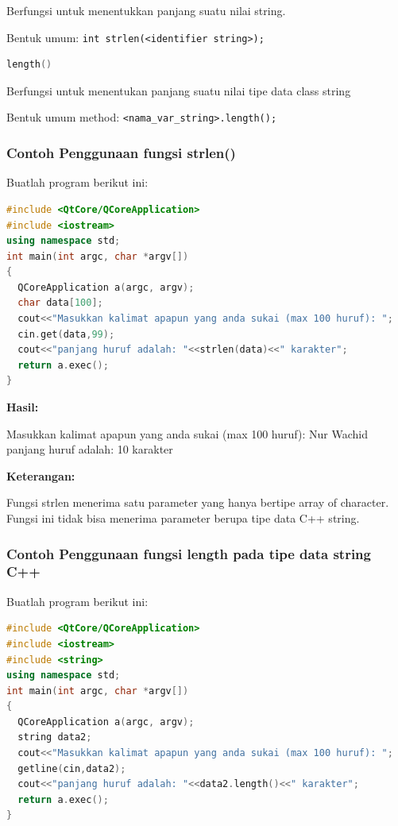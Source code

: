 Berfungsi untuk menentukkan panjang suatu nilai string.

Bentuk umum:
\texttt{int\ strlen(\textless{}identifier\ string\textgreater{});}

\begin{lstlisting}[language=c++, numbers=none]
length()
\end{lstlisting}

Berfungsi untuk menentukan panjang suatu nilai tipe data class string

Bentuk umum method:
\texttt{\textless{}nama\_var\_string\textgreater{}.length();}

\subsubsection*{Contoh  Penggunaan fungsi strlen()}

Buatlah program berikut ini:

\begin{lstlisting}[language=c++, caption=Penggunaan fungsi strlen(), label=contoh3-19]
#include <QtCore/QCoreApplication>
#include <iostream>
using namespace std;
int main(int argc, char *argv[])
{
  QCoreApplication a(argc, argv);
  char data[100];
  cout<<"Masukkan kalimat apapun yang anda sukai (max 100 huruf): ";
  cin.get(data,99);
  cout<<"panjang huruf adalah: "<<strlen(data)<<" karakter";
  return a.exec();
}
\end{lstlisting}

\textbf{Hasil:}

\begin{lcverbatim}
Masukkan kalimat apapun
yang anda sukai (max 100 huruf): Nur Wachid 
panjang huruf adalah: 10 karakter
\end{lcverbatim}
 

\textbf{Keterangan:}

Fungsi strlen menerima satu parameter yang hanya bertipe array of
character. Fungsi ini tidak bisa menerima parameter berupa tipe data C++
string.

\subsubsection*{Contoh  Penggunaan fungsi length pada tipe data string C++}

Buatlah program berikut ini:

\begin{lstlisting}[language=c++, caption=Penggunaan fungsi length pada tipe data string C++, label=contoh3-20]
#include <QtCore/QCoreApplication>
#include <iostream>
#include <string>
using namespace std;
int main(int argc, char *argv[])
{
  QCoreApplication a(argc, argv);
  string data2;
  cout<<"Masukkan kalimat apapun yang anda sukai (max 100 huruf): ";
  getline(cin,data2);
  cout<<"panjang huruf adalah: "<<data2.length()<<" karakter";
  return a.exec();
}
\end{lstlisting}

